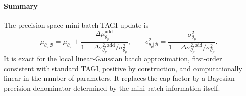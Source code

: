 \documentclass[11pt]{article}
\begin{document}
\paragraph{Summary}
The precision-space mini-batch TAGI update is
\[
    \mu_{\theta_p|\mathcal{B}}
    =
    \mu_{\theta_p}
    +
    \frac{
    \Delta \mu_{\theta_p}^{\mathrm{add}}
    }{
    1
    -
    \Delta \sigma_{\theta_p}^{2,\mathrm{add}}/
    \sigma^2_{\theta_p}
    },
    \qquad
    \sigma^2_{\theta_p|\mathcal{B}}
    =
    \frac{
    \sigma^2_{\theta_p}
    }{
    1
    -
    \Delta \sigma_{\theta_p}^{2,\mathrm{add}}/
    \sigma^2_{\theta_p}
    }.
\]
It is exact for the local linear-Gaussian batch approximation, first-order
consistent with standard TAGI, positive by construction, and computationally
linear in the number of parameters. It replaces the cap factor by a Bayesian
precision denominator determined by the mini-batch information itself.
\end{document}
